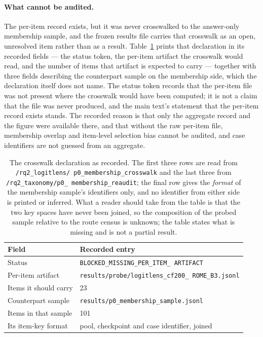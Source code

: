 \documentclass[letterpaper]{article}
\begin{document}
\paragraph{What cannot be audited.}
The per-item record exists, but it was never crosswalked to the answer-only
membership sample, and the frozen results file carries that crosswalk as an
open, unresolved item rather than as a result.  Table~\ref{tab:s7-crosswalk}
prints that declaration in its recorded fields --- the status token, the
per-item artifact the crosswalk would read, and the number of items that
artifact is expected to carry --- together with three fields describing the
counterpart sample on the membership side, which the declaration itself does
not name.  The status token records that the per-item file was not present
where the crosswalk would have been computed; it is not a claim that the file
was never produced, and the main text's statement that the per-item record
exists stands.  The recorded reason is that only the aggregate record and the
figure were available there, and that without the raw per-item file, membership
overlap and item-level selection bias cannot be audited, and case identifiers
are not guessed from an aggregate.

\begin{table}[t]
\centering
\small
\begin{tabular}{@{}p{}p{}@{}}
\toprule
Field & Recorded entry \\
\midrule
Status &
\texttt{BLOCKED\_\allowbreak MISSING\_\allowbreak PER\_ITEM\_\allowbreak
ARTIFACT} \\
Per-item artifact &
\texttt{results/\allowbreak probe/\allowbreak logitlens\_cf200\_\allowbreak
ROME\_B3.jsonl} \\
Items it should carry & 23 \\
Counterpart sample &
\texttt{results/\allowbreak p0\_membership\_\allowbreak sample.jsonl} \\
Items in that sample & 101 \\
Its item-key format & pool, checkpoint and case identifier, joined \\
\bottomrule
\end{tabular}
\caption{The crosswalk declaration as recorded.  The first three rows are read
from \texttt{/rq2\_\allowbreak logitlens/\allowbreak
p0\_\allowbreak membership\_\allowbreak crosswalk} and the last three from
\texttt{/rq2\_\allowbreak taxonomy/\allowbreak p0\_\allowbreak
membership\_\allowbreak reaudit}; the final row gives the \emph{format} of the
membership sample's identifiers only, and no identifier from either side is
printed or inferred.  What a reader should take from the table is that the two
key spaces have never been joined, so the composition of the probed sample
relative to the route census is unknown; the table states what is missing and
is not a partial result.}
\label{tab:s7-crosswalk}
\end{table}
\end{document}
